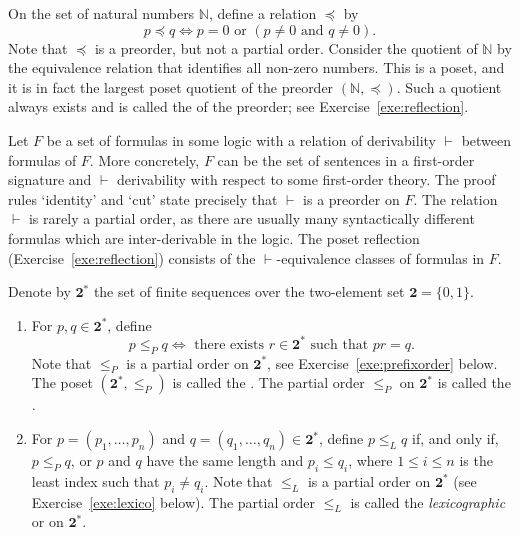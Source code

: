 \begin{example} \label{exa:preordernaturals}
On the set of natural numbers $\mathbb{N}$, define a relation $\preceq$ by
\[ p \preceq q \iff p = 0 \text{ or } (p \neq 0 \text{ and } q \neq 0).\]
Note that $\preceq$ is a preorder, but not a partial order. Consider the quotient of $\mathbb{N}$ by the equivalence relation that identifies all non-zero numbers.
This is a poset, and it is in fact the largest poset quotient of the preorder $(\mathbb{N},\preceq)$. Such a quotient always exists and is called the  of the preorder; see Exercise~\ref{exe:reflection}.
\end{example}



\begin{example}\label{exa:logicequivalence}
Let $F$ be a set of formulas in some logic with a relation of derivability $\vdash$ between formulas of $F$. More concretely, $F$ can be the set of sentences in a first-order signature and $\vdash$ derivability with respect to some first-order theory. The proof rules `identity' and `cut' state precisely that $\vdash$ is a preorder on $F$. The relation $\vdash$ is rarely a partial order, as there are usually many syntactically different formulas which are inter-derivable in the logic. The poset reflection (Exercise~\ref{exe:reflection}) consists of the $\vdash$-equivalence classes of formulas in $F$.
\end{example}

\begin{example} \label{exa:sequenceorders}
Denote by $\mathbf{2}^*$ the set of finite sequences over the two-element set $\mathbf{2} = \{0,1\}$.
\begin{enumerate}
\item For $p, q \in \mathbf{2}^*$, define
\[ p \leq_P q \iff \text{ there exists } r \in \mathbf{2}^* \text{ such that } pr = q.\]
Note that $\leq_P$ is a partial order on $\mathbf{2}^*$, see Exercise~\ref{exe:prefixorder} below. The poset $(\mathbf{2}^*,\leq_P)$ is called the . %
The partial order $\leq_P$ on $\mathbf{2}^*$ is called the .\label{exa:binaryprefix}
\item For $p = (p_1,\dots,p_n)$ and $q = (q_1,\dots,q_n) \in \mathbf{2}^*$, define $p \leq_L q$ if, and only if, $p \leq_P q$, or $p$ and $q$ have the same length and $p_i \leq q_i$, where $1 \leq i \leq n$ is the least index such that $p_i \neq q_i$.
Note that $\leq_L$ is a partial order on $\mathbf{2}^*$ (see Exercise~\ref{exe:lexico} below). The partial order $\leq_L$ is called the \emph{lexicographic} or  on $\mathbf{2}^*$.\label{exa:binarylexico}
\end{enumerate}
\end{example}









